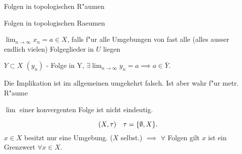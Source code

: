 \documentclass[class=article, crop=false]{standalone}
\begin{document}
\begin{zettel}{Folgen in topologischen R"aumen}
\begin{flashcard}[97xz6pab]{Folgen in topologischen Raeumen}
	\begin{definition}[Limes]
		$\lim_{n \to \infty} x_n =  a \in X$, falls f"ur alle Umgebungen von fast alle (alles ausser endlich vielen) Folgeglieder  in $U$ liegen
	\end{definition}
\end{flashcard}
\begin{lemma}
	$Y \subset X$ $(y_n)$ - Folge in Y, $\exists \lim_{n \to \infty}y_n = a \implies  a \in  \bar{Y}$.
\end{lemma}
\begin{remark}
	Die Implikation ist im allgemeinen umgekehrt falsch. Ist aber wahr f"ur metr. R"aume
\end{remark}
\begin{remark}
	$\lim$ einer konvergenten Folge ist nicht eindeutig.

	\begin{example}
		\[
			(X, \tau ) \quad \tau =  \set{\emptyset, X}
		.\]
		$ x \in  X$ besitzt nur eine Umgebung. ($X$ selbst.) $\implies $  $\forall $ Folgen gilt $x$ ist ein Grenzwert $\forall x \in  X$.
	\end{example}

\end{remark}
\end{zettel}
\end{document}
